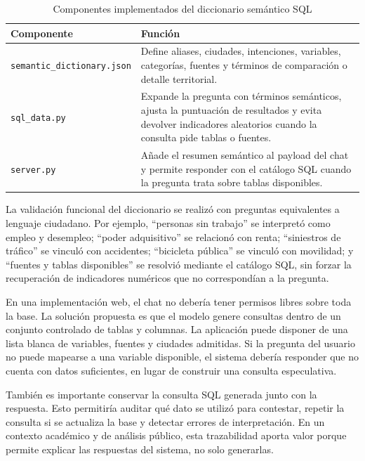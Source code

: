 \begin{table}[htbp]
\caption{Componentes implementados del diccionario semántico SQL}
\label{tab:componentes-diccionario-sql}
\centering
\begin{tabular}{p{} p{}}
\toprule
\textbf{Componente} & \textbf{Función} \\
\midrule
\texttt{semantic\_dictionary.json} & Define aliases, ciudades, intenciones, variables, categorías, fuentes y términos de comparación o detalle territorial. \\
\texttt{sql\_data.py} & Expande la pregunta con términos semánticos, ajusta la puntuación de resultados y evita devolver indicadores aleatorios cuando la consulta pide tablas o fuentes. \\
\texttt{server.py} & Añade el resumen semántico al payload del chat y permite responder con el catálogo SQL cuando la pregunta trata sobre tablas disponibles. \\
\bottomrule
\end{tabular}
\end{table}

La validación funcional del diccionario se realizó con preguntas equivalentes a lenguaje ciudadano. Por ejemplo, ``personas sin trabajo'' se interpretó como empleo y desempleo; ``poder adquisitivo'' se relacionó con renta; ``siniestros de tráfico'' se vinculó con accidentes; ``bicicleta pública'' se vinculó con movilidad; y ``fuentes y tablas disponibles'' se resolvió mediante el catálogo SQL, sin forzar la recuperación de indicadores numéricos que no correspondían a la pregunta.

En una implementación web, el chat no debería tener permisos libres sobre toda la base. La solución propuesta es que el modelo genere consultas dentro de un conjunto controlado de tablas y columnas. La aplicación puede disponer de una lista blanca de variables, fuentes y ciudades admitidas. Si la pregunta del usuario no puede mapearse a una variable disponible, el sistema debería responder que no cuenta con datos suficientes, en lugar de construir una consulta especulativa.

También es importante conservar la consulta SQL generada junto con la respuesta. Esto permitiría auditar qué dato se utilizó para contestar, repetir la consulta si se actualiza la base y detectar errores de interpretación. En un contexto académico y de análisis público, esta trazabilidad aporta valor porque permite explicar las respuestas del sistema, no solo generarlas.

